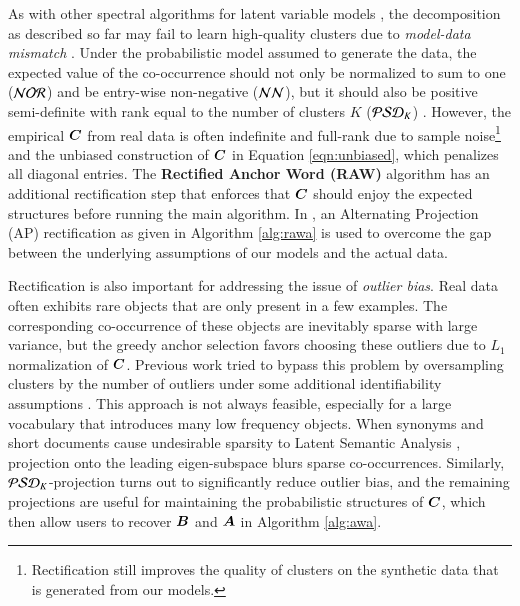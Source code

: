 As with other spectral algorithms for latent variable models 
\cite{hsu2012spectral,anandkumar2012}, the decomposition as described so far may
fail to learn high-quality clusters due to \textit{model-data  mismatch} 
\cite{kulesza2014low}. Under the probabilistic model assumed to generate the
data, the expected value of the co-occurrence should not only be normalized to
sum to one ($\mathcal{NOR}$) and be entry-wise non-negative ($\mathcal{NN}$), but it should also
be positive semi-definite with rank equal to the number of clusters $K$ 
($\mathcal{PSD}_K$) \cite{moontae2015nips}. However, the empirical $\bm{C}$ from real data
is often indefinite and full-rank due to sample noise\footnote{Rectification
still improves the quality of clusters on the synthetic data that is generated
from our models.} and the unbiased construction of $\bm{C}$ in Equation 
\eqref{eqn:unbiased}, which penalizes all diagonal entries. The 
\textbf{Rectified Anchor Word (RAW)} algorithm has an additional rectification
step that enforces that $\bm{C}$ should enjoy the expected structures
before running the main algorithm. In \cite{moontae2015nips}, an Alternating
Projection (AP) rectification as given in Algorithm \ref{alg:rawa} is used to
overcome the gap between the underlying assumptions of our models and the actual
data.

Rectification is also important for addressing the issue of \textit{outlier
bias}. Real data often exhibits rare objects that are only present in a few
examples. The corresponding co-occurrence of these objects are inevitably sparse
with large variance, but the greedy anchor selection favors choosing these
outliers due to $L_1$ normalization of $\bm{C}$. Previous work tried to bypass this
problem by oversampling clusters by the number of outliers under some additional
identifiability assumptions \cite{gillis2014fast}. This approach is not always
feasible, especially for a large vocabulary that introduces many low frequency
objects. When synonyms and short documents cause undesirable sparsity to Latent
Semantic Analysis \cite{landauer1998introduction}, projection onto the leading
eigen-subspace blurs sparse co-occurrences. Similarly, $\mathcal{PSD}_K$-projection turns
out to significantly reduce outlier bias, and the remaining projections are
useful for maintaining the probabilistic structures of $\bm{C}$, which then allow
users to recover $\bm{B}$ and $\bm{A}$ in Algorithm \ref{alg:awa}.

